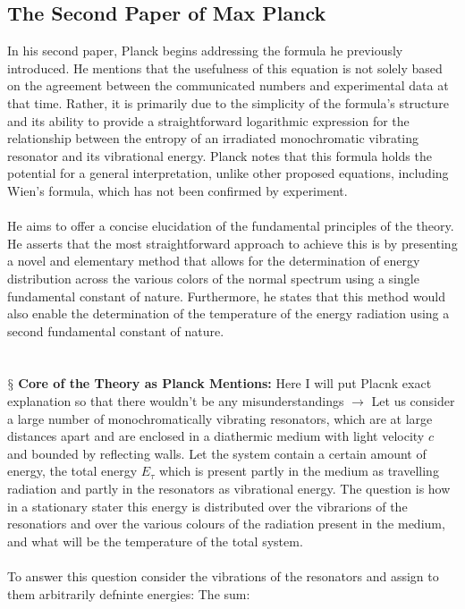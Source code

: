 \documentclass[9pt,a4paper, twocolumn]{article}
\newcounter{theo}
\newcommand{\newpoint}[1]{\ \\ \indent$\mathsection$ \textbf{#1}}
\begin{document}
        \subsection{The Second Paper of Max Planck}
            In his second paper, Planck begins addressing the formula he previously introduced. He mentions that the usefulness of this equation is not solely based on the agreement between the communicated numbers and experimental data at that time. Rather, it is primarily due to the simplicity of the formula's structure and its ability to provide a straightforward logarithmic expression for the relationship between the entropy of an irradiated monochromatic vibrating resonator and its vibrational energy. Planck notes that this formula holds the potential for a general interpretation, unlike other proposed equations, including Wien's formula, which has not been confirmed by experiment. 
            \\
            \\
            He aims to offer a concise elucidation of the fundamental principles of the theory. He asserts that the most straightforward approach to achieve this is by presenting a novel and elementary method that allows for the determination of energy distribution across the various colors of the normal spectrum using a single fundamental constant of nature. Furthermore, he states that this method would also enable the determination of the temperature of the energy radiation using a second fundamental constant of nature.
            \\
            \\
            \newpoint{Core of the Theory as Planck Mentions:} Here I will put Placnk exact explanation so that there wouldn't be any misunderstandings $\rightarrow$ Let us consider a large number of monochromatically vibrating resonators, which are at large distances apart and are enclosed in a diathermic medium with light velocity $c$ and bounded by reflecting walls. Let the system contain a certain amount of energy, the total energy $E_\tau$ which is present partly in the medium as travelling radiation and partly in the resonators as vibrational energy. The question is how in a stationary stater this energy is distributed over the vibrarions of the resonatiors and over the various colours of the radiation present in the medium, and what will be the temperature of the total system. 
            \\
            \\
            To answer this question consider the vibrations of the resonators and assign to them arbitrarily defninte energies: The sum:
\end{document}
